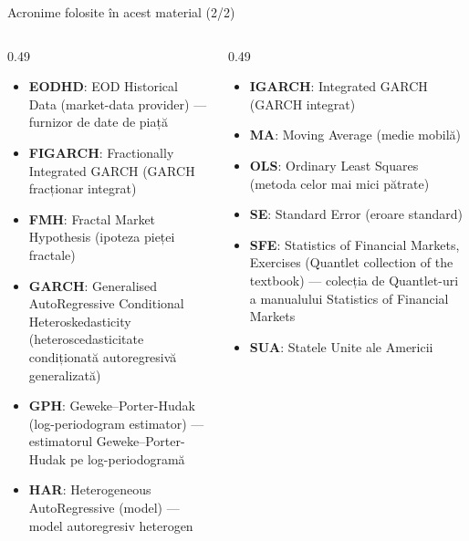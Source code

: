 \begin{frame}{Acronime folosite în acest material (2/2)}
\begin{columns}[T]
\begin{column}{0.49\textwidth}
\begin{itemize}\setlength{\itemsep}{0pt}
    \item \textbf{EODHD}: EOD Historical Data (market-data provider) — furnizor de date de piață
    \item \textbf{FIGARCH}: Fractionally Integrated GARCH (GARCH fracționar integrat)
    \item \textbf{FMH}: Fractal Market Hypothesis (ipoteza pieței fractale)
    \item \textbf{GARCH}: Generalised AutoRegressive Conditional Heteroskedasticity (heteroscedasticitate condiționată autoregresivă generalizată)
    \item \textbf{GPH}: Geweke–Porter-Hudak (log-periodogram estimator) — estimatorul Geweke–Porter-Hudak pe log-periodogramă
    \item \textbf{HAR}: Heterogeneous AutoRegressive (model) — model autoregresiv heterogen
\end{itemize}
\end{column}
\begin{column}{0.49\textwidth}
\begin{itemize}\setlength{\itemsep}{0pt}
    \item \textbf{IGARCH}: Integrated GARCH (GARCH integrat)
    \item \textbf{MA}: Moving Average (medie mobilă)
    \item \textbf{OLS}: Ordinary Least Squares (metoda celor mai mici pătrate)
    \item \textbf{SE}: Standard Error (eroare standard)
    \item \textbf{SFE}: Statistics of Financial Markets, Exercises (Quantlet collection of the textbook) — colecția de Quantlet-uri a manualului Statistics of Financial Markets
    \item \textbf{SUA}: Statele Unite ale Americii
\end{itemize}
\end{column}
\end{columns}
\end{frame}

